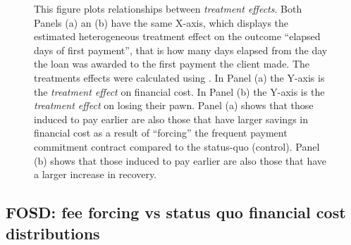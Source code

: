 \begin{figure}[H]
\begin{center}
\begin{subfigure}{0.45\textwidth}
    \end{subfigure}
    \end{center}
       \scriptsize 
       This figure plots relationships between \textit{treatment effects}. Both Panels (a) an (b) have the same X-axis, which displays the estimated heterogeneous treatment effect on the outcome ``elapsed days of first payment'', that is how many days elapsed from the day the loan was awarded to the first payment the client made. The treatments effects were calculated using \cite{atheygrf}. In Panel (a) the Y-axis is the \textit{treatment effect} on financial cost. In Panel (b) the Y-axis is the \textit{treatment effect} on losing their pawn. Panel (a) shows that those induced to pay earlier are also those that have larger savings in financial cost as a result of ``forcing'' the frequent payment commitment contract compared to the status-quo (control). Panel (b) shows that those induced to pay earlier are also those that have a larger increase in recovery.
\end{figure}





\vspace{.3in}

\subsection{FOSD: fee forcing vs status quo financial cost distributions}


